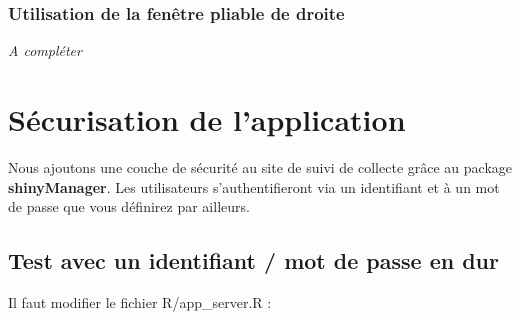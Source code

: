 \documentclass[
  letterpaper,
  DIV=11,
  numbers=noendperiod]{scrreprt}
\begin{document}
\hypertarget{utilisation-de-la-fenuxeatre-pliable-de-droite}{%
\subsection{Utilisation de la fenêtre pliable de
droite}\label{utilisation-de-la-fenuxeatre-pliable-de-droite}}

\emph{A compléter}


\hypertarget{suxe9curisation-de-lapplication}{%
\chapter{Sécurisation de
l'application}\label{suxe9curisation-de-lapplication}}

Nous ajoutons une couche de sécurité au site de suivi de collecte grâce
au package \textbf{shinyManager}. Les utilisateurs s'authentifieront via
un identifiant et à un mot de passe que vous définirez par ailleurs.

\hypertarget{test-avec-un-identifiant-mot-de-passe-en-dur}{%
\section{Test avec un identifiant / mot de passe en
dur}\label{test-avec-un-identifiant-mot-de-passe-en-dur}}

Il faut modifier le fichier R/app\_server.R :
\end{document}
